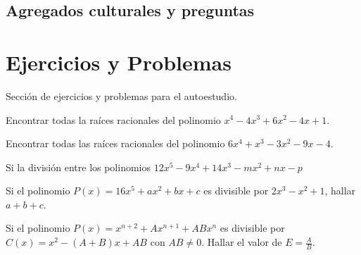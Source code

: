 \subsection{Agregados culturales y preguntas}
{

}

\section{Ejercicios y Problemas}
{
    Sección de ejercicios y problemas para el autoestudio.

    \begin{section-problem}
        Encontrar todas la raíces racionales del polinomio $x^4 - 4x^3 + 6x^2 - 4x + 1$.
    \end{section-problem}

    \begin{section-problem}
        Encontrar todas las raíces racionales del polinomio $6x^4 + x^3 - 3x^2 - 9x - 4$.
    \end{section-problem}

    \begin{section-problem}
        Si la división entre los polinomios $12x^5 - 9x^4 + 14x^3 - mx^2 + nx - p$
    \end{section-problem}

    \begin{section-problem}
        Si el polinomio $P(x) = 16x^5 + ax^2 + bx + c$ es divisible por $2x^3 - x^2 + 1$, hallar $a + b + c$.
    \end{section-problem}

    \begin{section-problem}
        Si el polinomio $P(x) = x^{n + 2} + Ax^{n + 1} + ABx^n$ es divisible por $C(x) = x^2 - (A + B)x + AB$ con $AB \neq 0$.
        Hallar el valor de $E = \frac{A}{B}$.
    \end{section-problem}
}